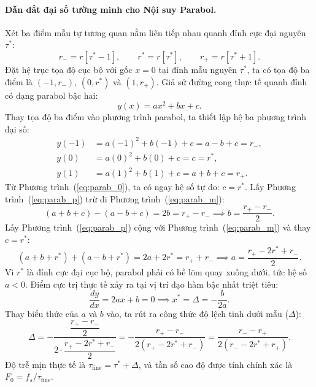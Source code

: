 \paragraph{Dẫn dắt đại số tường minh cho Nội suy Parabol.}
Xét ba điểm mẫu tự tương quan nằm liên tiếp nhau quanh đỉnh cực đại nguyên $\tau^*$:
\[
r_{-} = r[\tau^* - 1], \qquad r^* = r[\tau^*], \qquad r_{+} = r[\tau^* + 1].
\]
Đặt hệ trục tọa độ cục bộ với gốc $x = 0$ tại đỉnh mẫu nguyên $\tau^*$, ta có tọa độ ba điểm là $(-1, r_{-})$, $(0, r^*)$ và $(1, r_{+})$. Giả sử đường cong thực tế quanh đỉnh có dạng parabol bậc hai:
\[
y(x) = a x^2 + b x + c.
\]
Thay tọa độ ba điểm vào phương trình parabol, ta thiết lập hệ ba phương trình đại số:
\begin{align}
y(-1) &= a(-1)^2 + b(-1) + c = a - b + c = r_{-},\label{eq:parab_m}\\
y(0)  &= a(0)^2 + b(0) + c = c = r^*,\label{eq:parab_0}\\
y(1)  &= a(1)^2 + b(1) + c = a + b + c = r_{+}.\label{eq:parab_p}
\end{align}
Từ Phương trình~(\ref{eq:parab_0}), ta có ngay hệ số tự do: $c = r^*$.
Lấy Phương trình~(\ref{eq:parab_p}) trừ đi Phương trình~(\ref{eq:parab_m}):
\[
(a + b + c) - (a - b + c) = 2b = r_{+} - r_{-} \implies b = \frac{r_{+} - r_{-}}{2}.
\]
Lấy Phương trình~(\ref{eq:parab_p}) cộng với Phương trình~(\ref{eq:parab_m}) và thay $c = r^*$:
\[
(a + b + r^*) + (a - b + r^*) = 2a + 2r^* = r_{+} + r_{-} \implies a = \frac{r_{+} - 2r^* + r_{-}}{2}.
\]
Vì $r^*$ là đỉnh cực đại cục bộ, parabol phải có bề lõm quay xuống dưới, tức hệ số $a < 0$. Điểm cực trị thực tế xảy ra tại vị trí đạo hàm bậc nhất triệt tiêu:
\[
\frac{dy}{dx} = 2ax + b = 0 \implies x^* = \Delta = -\frac{b}{2a}.
\]
Thay biểu thức của $a$ và $b$ vào, ta rút ra công thức độ lệch tinh dưới mẫu ($\Delta$):
\[
\Delta = -\frac{\dfrac{r_{+} - r_{-}}{2}}{2 \cdot \dfrac{r_{+} - 2r^* + r_{-}}{2}} = -\frac{r_{+} - r_{-}}{2(r_{+} - 2r^* + r_{-})} = \frac{r_{-} - r_{+}}{2(r_{-} - 2r^* + r_{+})}.
\]
Độ trễ mịn thực tế là $\tau_{\mathrm{fine}} = \tau^* + \Delta$, và tần số cao độ được tính chính xác là $F_0 = f_s / \tau_{\mathrm{fine}}$.

